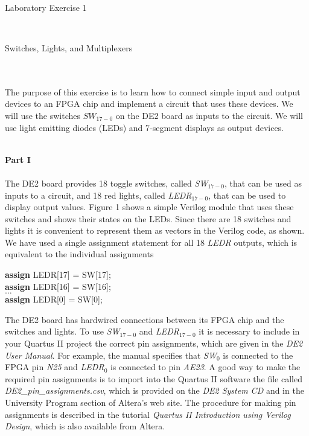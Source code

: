 \documentclass[psfig,10pt,fullpage]{article}
\begin{document}
~\\
~\\
~\\
\centerline{\huge Laboratory Exercise 1}
~\\
\centerline{\large Switches, Lights, and Multiplexers}
~\\
~\\

The purpose of this exercise is to learn how to connect simple input and
output devices to an FPGA chip and implement a circuit that uses these devices.
We will use the switches $SW_{17-0}$ on the DE2 board as inputs to the circuit.
We will use light emitting diodes (LEDs) and 7-segment displays as output
devices.

~\\
\noindent
{\bf Part I}
~\\
~\\
\noindent
The DE2 board provides 18 toggle switches, called {\it SW}$_{17-0}$, that can be used as
inputs to a circuit, and 18 red lights, called {\it LEDR}$_{17-0}$, that can be used to
display output values. Figure 1 shows a simple Verilog module that uses these switches 
and shows their states on the LEDs. Since there are 18 switches and lights
it is convenient to represent them as vectors in the Verilog code, as shown. We have used a
single assignment statement for all 18 {\it LEDR} outputs, which is equivalent to the 
individual assignments

\begin{center}
\begin{minipage}[t]{12.5 cm}
\begin{tabbing}
{\bf assign} LEDR[17] = SW[17];\\
{\bf assign} LEDR[16] = SW[16];\\
$\ldots$\\
{\bf assign} LEDR[0] = SW[0];
\end{tabbing}
\end{minipage}
\end{center}
The DE2 board has hardwired connections between its FPGA chip and the switches and
lights. To use {\it SW}$_{17-0}$ and {\it LEDR}$_{17-0}$ it is necessary to include in
your Quartus II project the correct pin assignments, which are given in the {\it DE2 
User Manual}. For example, the manual specifies that {\it SW}$_0$ is connected to the
FPGA pin {\it N25} and {\it LEDR}$_0$ is connected to pin {\it AE23}. A good way to
make the required pin assignments is to import into the Quartus II software the file called
{\it DE2\_pin\_assignments.csv}, which is provided on the {\it DE2 System CD} and 
in the University Program section of
Altera's web site.  The procedure for making pin assignments is described in the 
tutorial {\it Quartus II Introduction using Verilog Design}, which is also available from
Altera.
\end{document}
